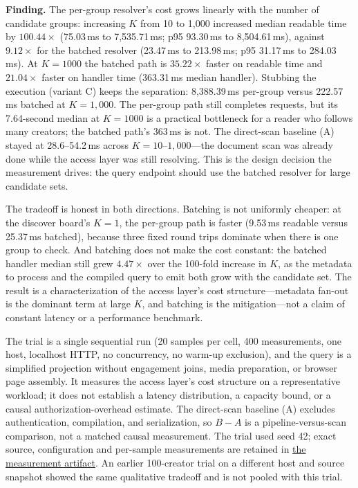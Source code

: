 \documentclass[sigconf, nonacm]{acmart}
\newcommand{\artifactbase}{https://github.com/jacoby149/web10}
\newcommand{\domainartifactrev}{26720acba859c7eb03fc5d26a6221cdde5b764a1}
\newcommand{\domainartifactdir}[2]{\href{\artifactbase/tree/\domainartifactrev/#1}{#2}}
\begin{document}
\textbf{Finding.} The per-group resolver's cost grows linearly with the
number of candidate groups: increasing $K$ from 10 to 1,000 increased median
readable time by $100.44\times$ (75.03\,ms to 7,535.71\,ms; p95 93.30\,ms to
8,504.61\,ms), against $9.12\times$ for the batched resolver (23.47\,ms to
213.98\,ms; p95 31.17\,ms to 284.03\,ms). At $K=1000$ the batched path is
$35.22\times$ faster on readable time and $21.04\times$ faster on handler
time (363.31\,ms median handler). Stubbing the execution (variant C) keeps
the separation: 8,388.39\,ms per-group versus 222.57\,ms batched at
$K=1{,}000$. The per-group path still completes requests, but its
7.64-second median at $K=1000$ is a practical bottleneck for a reader who
follows many creators; the batched path's 363\,ms is not. The direct-scan
baseline (A) stayed at 28.6--54.2\,ms across $K = 10$--$1{,}000$---the
document scan was already done while the access layer was still resolving.
This is the design decision the measurement drives: the query endpoint
should use the batched resolver for large candidate sets.

The tradeoff is honest in both directions. Batching is not uniformly
cheaper: at the discover board's $K=1$, the per-group path is faster
(9.53\,ms readable versus 25.37\,ms batched), because three fixed round
trips dominate when there is one group to check. And batching does not make
the cost constant: the batched handler median still grew $4.47\times$ over
the 100-fold increase in $K$, as the metadata to process and the compiled
query to emit both grow with the candidate set. The result is a
characterization of the access layer's cost structure---metadata fan-out is
the dominant term at large $K$, and batching is the mitigation---not a claim
of constant latency or a performance benchmark.

The trial is a single sequential run (20 samples per cell, 400 measurements,
one host, localhost HTTP, no concurrency, no warm-up exclusion), and the
query is a simplified projection without engagement joins, media preparation,
or browser page assembly. It measures the access layer's cost structure on a
representative workload; it does not establish a latency distribution, a
capacity bound, or a causal authorization-overhead estimate. The direct-scan
baseline (A) excludes authentication, compilation, and serialization, so
$B - A$ is a pipeline-versus-scan comparison, not a matched causal
measurement. The trial used seed 42; exact source, configuration and
per-sample measurements are retained in
\domainartifactdir{research/experiments/costfn}{the measurement artifact}. An
earlier 100-creator trial on a different host and source snapshot showed the
same qualitative tradeoff and is not pooled with this trial.
\end{document}
